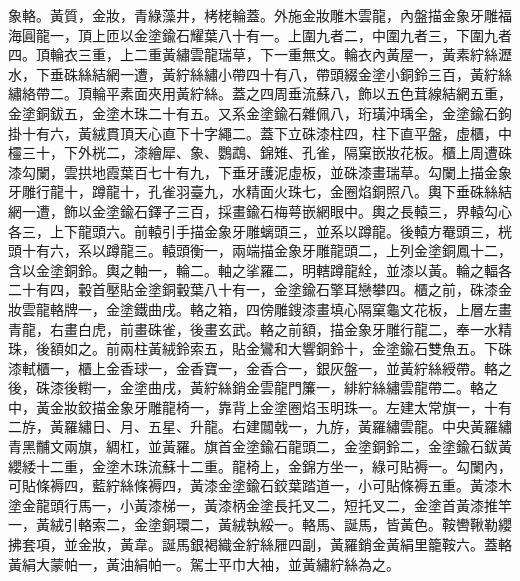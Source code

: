 \begin{pinyinscope}
 象輅。黃質，金妝，青綠藻井，栲栳輪蓋。外施金妝雕木雲龍，內盤描金象牙雕福海圓龍一，頂上匝以金塗鍮石耀葉八十有一。上圍九者二，中圍九者三，下圍九者四。頂輪衣三重，上二重黃繡雲龍瑞草，下一重無文。輪衣內黃屋一，黃素紵絲瀝水，下垂硃絲結網一遭，黃紵絲繡小帶四十有八，帶頭綴金塗小銅鈴三百，黃紵絲繡絡帶二。頂輪平素面夾用黃紵絲。蓋之四周垂流蘇八，飾以五色茸線結網五重，金塗銅鈸五，金塗木珠二十有五。又系金塗鍮石雜佩八，珩璜沖瑀全，金塗鍮石鉤掛十有六，黃絨貫頂天心直下十字繩二。蓋下立硃漆柱四，柱下直平盤，虛櫃，中欞三十，下外桄二，漆繪犀、象、鸚鵡、錦雉、孔雀，隔窠嵌妝花板。櫃上周遭硃漆勾闌，雲拱地霞葉百七十有九，下垂牙護泥虛板，並硃漆畫瑞草。勾闌上描金象牙雕行龍十，蹲龍十，孔雀羽臺九，水精面火珠七，金圈焰銅照八。輿下垂硃絲結網一遭，飾以金塗鍮石鐸子三百，採畫鍮石梅萼嵌網眼中。輿之長轅三，界轅勾心各三，上下龍頭六。前轅引手描金象牙雕螭頭三，並系以蹲龍。後轅方罨頭三，桄頭十有六，系以蹲龍三。轅頭衡一，兩端描金象牙雕龍頭二，上列金塗銅鳳十二，含以金塗銅鈴。輿之軸一，輪二。軸之挲羅二，明轄蹲龍絟，並漆以黃。輪之輻各二十有四，轂首壓貼金塗銅轂葉八十有一，金塗鍮石擎耳戀攀四。櫃之前，硃漆金妝雲龍輅牌一，金塗鐵曲戌。輅之箱，四傍雕鎪漆畫填心隔窠龜文花板，上層左畫青龍，右畫白虎，前畫硃雀，後畫玄武。輅之前額，描金象牙雕行龍二，奉一水精珠，後額如之。前兩柱黃絨鈴索五，貼金鸞和大響銅鈴十，金塗鍮石雙魚五。下硃漆軾櫃一，櫃上金香球一，金香寶一，金香合一，銀灰盤一，並黃紵絲綬帶。輅之後，硃漆後轛一，金塗曲戌，黃紵絲銷金雲龍門簾一，緋紵絲繡雲龍帶二。輅之中，黃金妝鉸描金象牙雕龍椅一，靠背上金塗圈焰玉明珠一。左建太常旗一，十有二斿，黃羅繡日、月、五星、升龍。右建闒戟一，九斿，黃羅繡雲龍。中央黃羅繡青黑黼文兩旗，綢杠，並黃羅。旗首金塗鍮石龍頭二，金塗銅鈴二，金塗鍮石鈸黃纓緌十二重，金塗木珠流蘇十二重。龍椅上，金錦方坐一，綠可貼褥一。勾闌內，可貼條褥四，藍紵絲條褥四，黃漆金塗鍮石鉸葉踏道一，小可貼條褥五重。黃漆木塗金龍頭行馬一，小黃漆梯一，黃漆柄金塗長托叉二，短托叉二，金塗首黃漆推竿一，黃絨引輅索二，金塗銅環二，黃絨執綏一。輅馬、誕馬，皆黃色。鞍轡鞦勒纓拂套項，並金妝，黃韋。誕馬銀褐織金紵絲屜四副，黃羅銷金黃絹里籠鞍六。蓋輅黃絹大蒙帕一，黃油絹帕一。駕士平巾大袖，並黃繡紵絲為之。




\end{pinyinscope}
